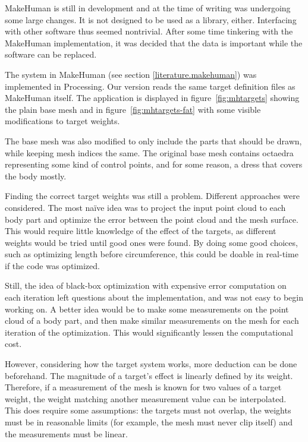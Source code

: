 MakeHuman is still in development and at the time of writing was undergoing some large changes. It is not designed to be used as a library, either. Interfacing with other software thus seemed nontrivial. After some time tinkering with the MakeHuman implementation, it was decided that the data is important while the software can be replaced.

The  system in MakeHuman (see section \ref{literature.makehuman}) was implemented in Processing. Our version reads the same target definition files as MakeHuman itself. The application is displayed in figure~\ref{fig:mhtargets} showing the plain base mesh and in figure~\ref{fig:mhtargets-fat} with some visible modifications to target weights.

The base mesh was also modified to only include the parts that should be drawn, while keeping mesh indices the same. The original base mesh contains octaedra representing some kind of control points, and for some reason, a dress that covers the body mostly.

\newtopic

Finding the correct target weights was still a problem. Different approaches were considered. The most naïve idea was to project the input point cloud to each body part and optimize the error between the point cloud and the mesh surface. This would require little knowledge of the effect of the targets, as different weights would be tried until good ones were found. By doing some good choices, such as optimizing length before circumference, this could be doable in real-time if the code was optimized.

Still, the idea of black-box optimization with expensive error computation on each iteration left questions about the implementation, and was not easy to begin working on. A better idea would be to make some measurements on the point cloud of a body part, and then make similar measurements on the mesh for each iteration of the optimization. This would significantly lessen the computational cost.

However, considering how the target system works, more deduction can be done beforehand. The magnitude of a target's effect is linearly defined by its weight. Therefore, if a measurement of the mesh is known for two values of a target weight, the weight matching another measurement value can be interpolated. This does require some assumptions: the targets must not overlap, the weights must be in reasonable limits (for example, the mesh must never clip itself) and the measurements must be linear.

